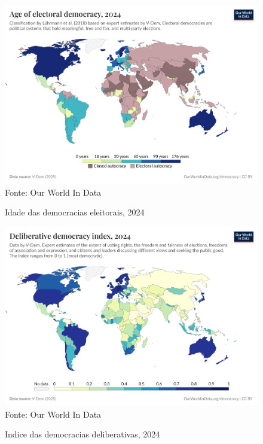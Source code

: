\begin{figure}[ht]
    \centering
    \caption{Idade das democracias eleitorais, 2024}
    \includegraphics[width=1\linewidth]{figuras/democracia/age-of-electoral-democracy.png}
    \label{fig:age-of-electoral-democracy}
    \footnotesize{Fonte: Our World In Data}
\end{figure}


\begin{figure}[ht]
    \centering
    \caption{Indice das democracias deliberativas, 2024}
    \includegraphics[width=1\linewidth]{figuras/democracia/deliberative-democracy-index-vdem.png}
    \label{fig:deliberative-democracy-index-vdem}
    \footnotesize{Fonte: Our World In Data}
\end{figure}

